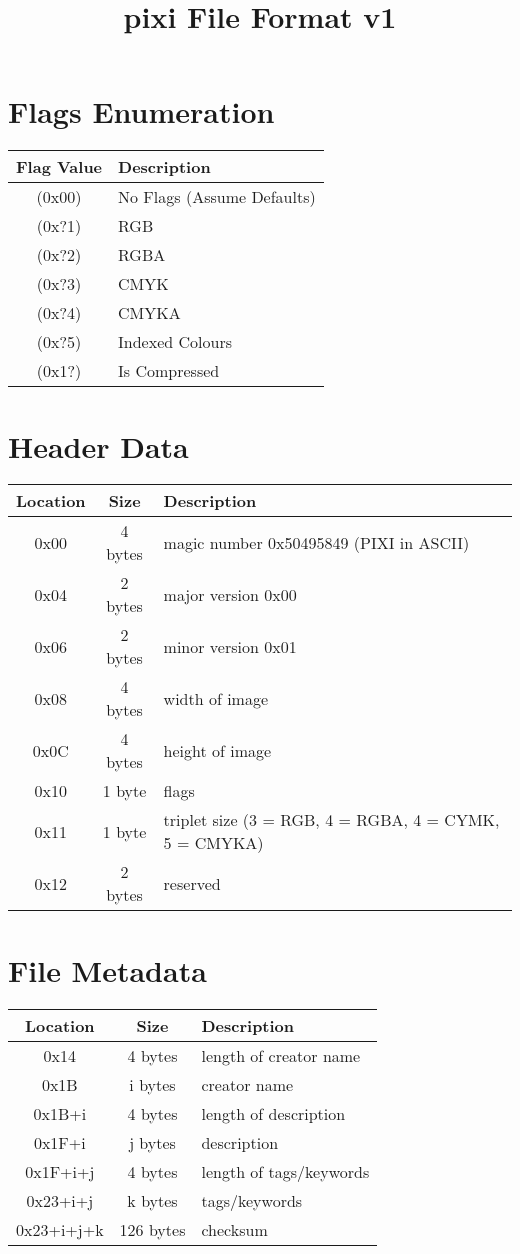 \documentclass{article}
\begin{document}
\title{pixi File Format v1}

\maketitle

\section{Flags Enumeration}
\begin{longtable}{|c|l|}
\hline
\textbf{Flag Value} & \textbf{Description} \\
\hline
(0x00) & No Flags (Assume Defaults) \\
(0x?1) & RGB \\
(0x?2) & RGBA \\
(0x?3) & CMYK \\
(0x?4) & CMYKA \\
(0x?5) & Indexed Colours \\
(0x1?) & Is Compressed \\
\hline
\end{longtable}

\section{Header Data}
\begin{longtable}{|c|c|l|}
\hline
\textbf{Location} & \textbf{Size} & \textbf{Description} \\
\hline
0x00 & 4 bytes & magic number 0x50495849 (PIXI in ASCII) \\
0x04 & 2 bytes & major version 0x00 \\
0x06 & 2 bytes & minor version 0x01 \\
0x08 & 4 bytes & width of image \\
0x0C & 4 bytes & height of image \\
0x10 & 1 byte  & flags \\
0x11 & 1 byte  & triplet size (3 = RGB, 4 = RGBA, 4 = CYMK, 5 = CMYKA) \\
0x12 & 2 bytes & reserved \\
\hline
\end{longtable}

\section{File Metadata}
\begin{longtable}{|c|c|l|}
\hline
\textbf{Location} & \textbf{Size} & \textbf{Description} \\
\hline
0x14       & 4 bytes   & length of creator name \\
0x1B       & i bytes   & creator name \\
0x1B+i     & 4 bytes   & length of description \\
0x1F+i     & j bytes   & description \\
0x1F+i+j   & 4 bytes   & length of tags/keywords \\
0x23+i+j   & k bytes   & tags/keywords \\
0x23+i+j+k & 126 bytes & checksum \\
\hline
\end{longtable}
\end{document}

